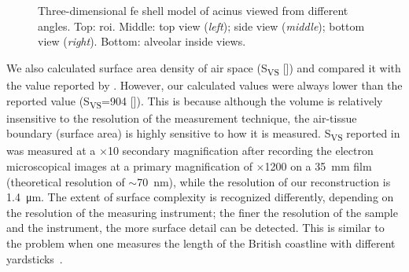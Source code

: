 \begin{figure}
%
	\caption[\threed \acs{fe} shell model of a partial acinus]{Three-dimensional \ac{fe} shell model of acinus viewed from different angles. Top: \ac{roi}. Middle: top view (\emph{left}); side view (\emph{middle}); bottom view (\emph{right}). Bottom: alveolar inside views.}
	\label{fig:alveolus}
\end{figure}

We also calculated surface area density of air space (S\textsubscript{VS} [\centimetresquared\per\centimetrecubed]) and compared it with the value reported by \cite{Tschanz2003}. However, our calculated values were always lower than the reported value (S\textsubscript{VS}=904 [\centimetresquared\per\centimetrecubed]). This is because although the volume is relatively insensitive to the resolution of the measurement technique, the air-tissue boundary (surface area) is highly sensitive to how it is measured. S\textsubscript{VS} reported in \citet{Tschanz2003} was measured at a $\times$10 secondary magnification after recording the electron microscopical images at a primary magnification of $\times$1200 on a \SI{35}{\milli\meter} film (theoretical resolution of $\sim$\SI{70}{\nano\meter}), while the resolution of our \threed reconstruction is \SI{1.4}{\micro\meter}. The extent of surface complexity is recognized differently, depending on the resolution of the measuring instrument; the finer the resolution of the sample and the instrument, the more surface detail can be detected. This is similar to the problem when one measures the length of the British coastline with different yardsticks~\cite{Mandelbrot1967}.

